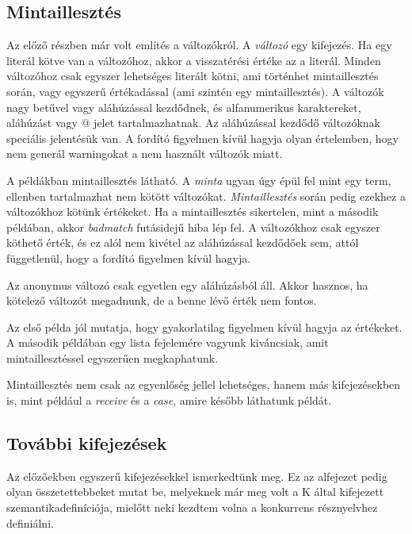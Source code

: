\documentclass[twoside, a4paper, 12pt]{article}
\begin{document}
\subsection{Mintaillesztés}
Az előző részben már volt említés a változókról. A \textit{változó} egy kifejezés. Ha egy literál kötve van a változóhoz, akkor a visszatérési értéke az a literál. Minden változóhoz csak egyszer lehetséges literált kötni, ami történhet mintaillesztés során, vagy egyszerű értékadással (ami szintén egy mintaillesztés). A változók nagy betűvel vagy aláhúzással kezdődnek, és alfanumerikus karaktereket, aláhúzást vagy @ jelet tartalmazhatnak. Az aláhúzással kezdődő változóknak speciális jelentésük van. A fordító figyelmen kívül hagyja olyan értelemben, hogy nem generál warningokat a nem használt változók miatt.



A példákban mintaillesztés látható. A \textit{minta} ugyan úgy épül fel mint egy term, ellenben tartalmazhat nem kötött változókat. \textit{Mintaillesztés} során pedig ezekhez a változókhoz kötünk értékeket. Ha a mintaillesztés sikertelen, mint a második példában, akkor \textit{badmatch} futásidejű hiba lép fel. A változókhoz csak egyszer köthető érték, és ez alól nem kivétel az aláhúzással kezdődőek sem, attól függetlenül, hogy a fordító figyelmen kívül hagyja.

Az anonymus változó csak egyetlen egy aláhúzásból áll. Akkor hasznos, ha kötelező változót megadnunk, de a benne lévő érték nem fontos.



Az első példa jól mutatja, hogy gyakorlatilag figyelmen kívül hagyja az értékeket. A második példában egy lista fejelemére vagyunk kiváncsiak, amit mintaillesztéssel egyszerűen megkaphatunk.

Mintaillesztés nem csak az egyenlőség jellel lehetséges, hanem más kifejezésekben is, mint például a \textit{receive} és a \textit{case}, amire később láthatunk példát.

\subsection {További kifejezések}

Az előzőekben egyszerű kifejezésekkel ismerkedtünk meg. Ez az alfejezet pedig olyan összetettebbeket mutat be, melyeknek már meg volt a K által kifejezett szemantikadefiníciója, mielőtt neki kezdtem volna a konkurrens résznyelvhez definiálni.
\end{document}
